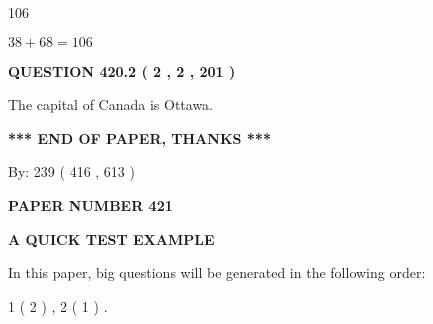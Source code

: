 \documentclass[12pt]{article}
\begin{document}
106
 
 
 
 
\noindent{}

$ %
38 +  %
68=   %
106$
 
 
  
\vspace{0.2in}
  
{\textbf{\Large{QUESTION
420.2 
 ( 2 , 2 , 201 )
}}}
  
  
 
 
\noindent{}
 
 
The capital of Canada is Ottawa.
 
 
 
 
   
   
 \vspace{0.2in}
 
   
   
   
   
\vspace{1.0in} 
{\textbf{\large{ *** END OF PAPER, THANKS *** }}} 
   
   
\hspace{1.0in} By: 
 239 ( 416 ,  613 )
   
   
   
   
\newpage 
\setcounter{page}{ 
   421001 } 
   
   
   
   
 {\textbf{ \Large{ PAPER NUMBER  421  }}}
   
   
\vspace{0.2in}
   
   
   
   
   
   
 \vspace{0.2in}
{\LARGE {\textbf{ A QUICK TEST EXAMPLE}}}
   
   
   
\vspace{0.2in}
   
In this paper, big questions will be generated in the following order: 
   
   
   1 ( 2 )
 ,
   2 ( 1 )
 .
  
\vspace{0.2in}
  
\end{document}
